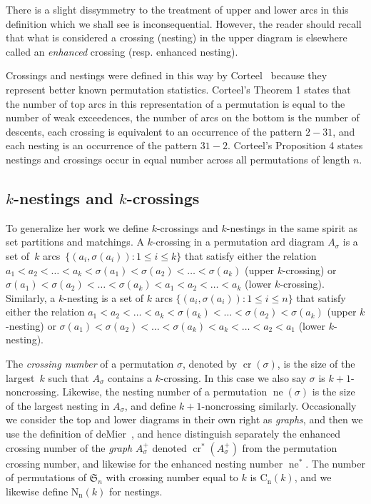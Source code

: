 \documentclass{amsart}
\begin{document}
There is a slight dissymmetry to the treatment of upper and lower arcs in this definition which we shall see is inconsequential. However, the reader should recall that what is considered a crossing (nesting) in the upper diagram is elsewhere called an \emph{enhanced} crossing (resp. enhanced nesting). 

Crossings and nestings were defined in this way by Corteel~\cite{Corteel07} because they represent better known permutation statistics. Corteel's Theorem 1 states that the number of top arcs in this representation of a permutation is equal to the number of weak exceedences, the number of arcs on the bottom is the number of descents, each crossing is equivalent to an occurrence of the pattern $2-31$, and each nesting is an occurrence of the pattern $31-2$. Corteel's Proposition 4 states nestings and crossings occur in equal number across all permutations of length $n$. 

\subsection{$k$-nestings and $k$-crossings}
To generalize her work we define $k$-crossings and $k$-nestings in the same spirit as set partitions and matchings. A $k$-crossing in a permutation ard diagram $A_\sigma$ is a set of~$k$ arcs~$\{(a_i, \sigma(a_i)):1\leq i\leq k\}$ that satisfy either the relation $a_1<a_2<\dots<a_k<\sigma(a_1)<\sigma(a_2)<\dots<\sigma(a_k)$ (upper $k$-crossing)
or $\sigma(a_1)<\sigma(a_2)<\dots<\sigma(a_k)<a_1<a_2<\dots<a_k$ (lower $k$-crossing). Similarly, a $k$-nesting is a set of $k$ arcs $\{(a_i, \sigma(a_i)):1\leq i\leq n\}$ that satisfy either the relation $a_1<a_2<\dots<a_k<\sigma(a_k)<\dots<\sigma(a_2)<\sigma(a_k)$ (upper $k$-nesting)
or $\sigma(a_1)<\sigma(a_2)<\dots<\sigma(a_k)<a_k<\dots<a_2<a_1$ (lower $k$-nesting). 

The \emph{ crossing number\/} of a permutation $\sigma$, denoted by ${\operatorname{cr}}(\sigma)$, is the size of the largest~$k$ such that $A_\sigma$ contains a $k$-crossing. In this case we also say $\sigma$ is $k+1$-noncrossing. Likewise, the nesting number of a permutation ${\operatorname{ne}}(\sigma)$ is the size of the largest nesting in $A_\sigma$, and define $k+1$-noncrossing similarly. Occasionally we consider the top and lower diagrams in their own right as \emph{ graphs}, and then we use the definition of deMier~\cite{deMi07}, and hence distinguish separately the enhanced crossing number of the \emph{ graph} $A_\sigma^+$ denoted ${\operatorname{cr}}^*(A_\sigma^+)$ from the permutation crossing number, and likewise for the enhanced nesting number ${\operatorname{ne}}^*$.  The number of permutations of ${\mathfrak{S}_n}$ with crossing number equal to $k$ is ${\operatorname{C_n}}(k)$, and we likewise define ${\operatorname{N_n}}(k)$ for nestings.
\end{document}
